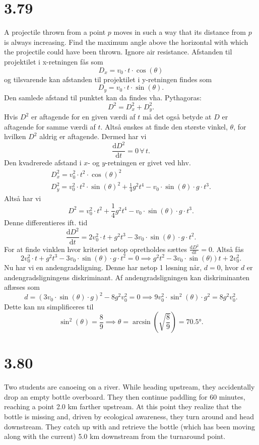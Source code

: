 \documentclass[12pt]{article}
\begin{document}
\section*{3.79}
	A projectile thrown from a point $p$ moves in such a way that its distance from $p$ is always increasing. Find the maximum angle above the horizontal with which the projectile could have been thrown. Ignore air resistance.
\bigbreak
Afstanden til projektilet i x-retningen fås som
\[
D_x = v_0 \cdot t \cdot \cos\left( \theta \right)
\] 
og tilsvarende kan afstanden til projektilet i y-retningen findes som
\[
D_y = v_0 \cdot t \cdot \sin\left( \theta \right) 
.\] 
Den samlede afstand til punktet kan da findes vha. Pythagoras:
\[
D^2 = D_x^2 + D_y^2
.\] 
Hvis $D^2$ er aftagende for en given værdi af $t$ må det også betyde at $D$ er aftagende for samme værdi af $t$. Altså ønskes at finde den største vinkel, $\theta$, for hvilken $D^2$ aldrig er aftagende. Dermed har vi
\[
\frac{\mathrm{d}D^2}{\mathrm{d}t} = 0 \, \forall \, t
.\] 
Den kvadrerede afstand i $x$- og $y$-retningen er givet ved hhv.
\begin{gather*}
  D_x^2 =  v_0^2\cdot t^2 \cdot \cos\left( \theta \right)^2 \\
  D_y^2 =  v_0^2\cdot t^2\cdot \sin\left( \theta \right) ^2 + \frac{1}{4}g^2t^4 - v_0 \cdot  \sin\left( \theta \right) \cdot g\cdot t^3
.\end{gather*}
Altså har vi
\[
D^2 = v_0^2\cdot t^2 + \frac{1}{4}g^2t^4 - v_0 \cdot  \sin\left( \theta \right) \cdot g\cdot t^3
.\] 
Denne differentieres ift. tid
\[
\frac{\mathrm{d}D^2}{\mathrm{d}t} = 2v_0^2\cdot t + g^2t^3 - 3v_0 \cdot \sin\left( \theta \right) \cdot g \cdot t^2
.\]
For at finde vinklen hvor kriteriet netop opretholdes sættes $\frac{\mathrm{d}D^2}{\mathrm{d}t} = 0$. Altså fås
\[
 2v_0^2\cdot t + g^2t^3 - 3v_0 \cdot \sin\left( \theta \right) \cdot g \cdot t^2 = 0 \implies g^2t^2 - 3v_0 \cdot \sin\left( \theta)\right) t + 2v_0^2
.\]
Nu har vi en andengradsligning. Denne har netop 1 løsning når, $d = 0$, hvor $d$ er andengradsligningens diskriminant. Af andengradsligningen kan diskriminanten aflæses som
 \[
d = \left( 3v_0\cdot \sin\left( \theta \right) \cdot g \right)^2 - 8g^2v_0^2 = 0 \implies 9v_0^2\cdot \sin^2\left( \theta \right) \cdot g^2= 8g^2v_0^2 
.\] 
Dette kan nu simplificeres til
\[
\sin^2(\theta) = \frac{8}{9} \implies \theta = \arcsin\left( \sqrt{\frac{8}{9}}  \right) = \ang{70,5} 
.\]


\section*{3.80}
	Two students are canoeing on a river. While heading upstream, they accidentally drop an empty bottle overboard. They then continue paddling for 60 minutes, reaching a point 2.0 km farther upstream. At this point they realize that the bottle is missing and, driven by ecological awareness, they turn around and head downstream. They catch up with and retrieve the bottle (which has been moving along with the current) 5.0 km downstream from the turnaround point.	 
\end{document}
